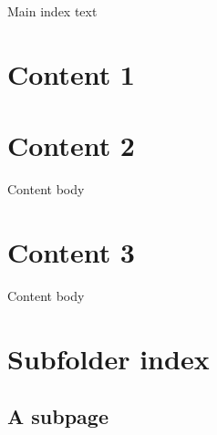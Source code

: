 

\pagestyle{empty}
\sphinxmaketitle
\pagestyle{plain}
\sphinxtableofcontents
\pagestyle{normal}
\label{\detokenize{index::doc}}


Main index text


\chapter{Content 1}
\label{\detokenize{content1:content-1}}\label{\detokenize{content1::doc}}

\chapter{Content 2}
\label{\detokenize{content2:content-2}}\label{\detokenize{content2::doc}}
Content body


\chapter{Content 3}
\label{\detokenize{content3:content-3}}\label{\detokenize{content3::doc}}
Content body


\chapter{Subfolder index}
\label{\detokenize{subfolder/index:subfolder-index}}\label{\detokenize{subfolder/index::doc}}

\section{A subpage}
\label{\detokenize{subfolder/asubpage:a-subpage}}\label{\detokenize{subfolder/asubpage::doc}}






\renewcommand{\indexname}{Index}
\printindex
